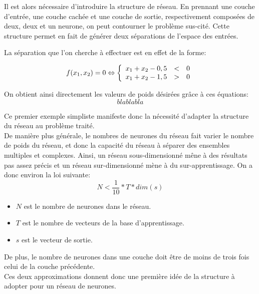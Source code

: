 \documentclass[a4paper,twoside]{report}
\begin{document}
				Il est alors nécessaire d'introduire la structure de réseau. En prennant une couche d'entrée, une couche cachée et une couche de sortie, respectivement composées de deux, deux et un neurone, on peut contourner le problème sus-cité. Cette structure permet en fait de générer deux séparations de l'espace des entrées.

				La séparation que l'on cherche à effectuer est en effet de la forme:

				\begin{equation}
					f(x_{1},x_{2})=0 \Leftrightarrow
					\left\{
					\begin{array}{r c l}
						x_{1}+x_{2}-0,5 &<& 0\\
						x_{1}+x_{2}-1,5 &>& 0
					\end{array}
					\right.
				\end{equation}

				On obtient ainsi directement les valeurs de poids désirées grâce à ces équations:
				\begin{equation}
					blablabla
				\end{equation}

				Ce premier exemple simpliste manifeste donc la nécessité d'adapter la structure du réseau au problème traité.\\

				De manière plus générale, le nombres de neurones du réseau fait varier le nombre de poids du réseau, et donc la capacité du réseau à séparer des ensembles multiples et complexes. Ainsi, un réseau sous-dimensionné mêne à des résultats pas assez précis et un réseau sur-dimensionné mène à du sur-apprentissage. On a donc environ la loi suivante:
				\begin{equation}
					N<\frac{1}{10}*T*dim(s)
				\end{equation}
				\begin{itemize}
					\item $N$ est le nombre de neurones dans le réseau.
					\item $T$ est le nombre de vecteurs de la base d'apprentissage.
					\item $s$ est le vecteur de sortie.
				\end{itemize}

				De plus, le nombre de neurones dans une couche doit être de moins de trois fois celui de la couche précédente.\\

				Ces deux approximations donnent donc une première idée de la structure à adopter pour un réseau de neurones.
\end{document}
